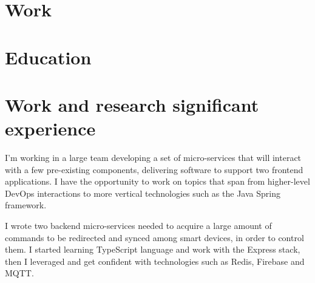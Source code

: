 \documentclass[11pt,a4paper,sans]{moderncv}        %
\begin{document}
\makecvtitle

\setlength{\parskip}{5pt}

\section{Work}
{}{}

\section{Education}
{}{}


\section{Work and research significant experience}

{
    I'm working in a large team developing a set of micro-services that will interact with a few pre-existing components, delivering software to support two frontend applications. I have the opportunity to work on topics that span from higher-level DevOps interactions to more vertical technologies such as the Java Spring framework.
}

{
    I wrote two backend micro-services needed to acquire a large amount of commands to be redirected and synced among smart devices, in order to control them. I started learning TypeScript language and work with the Express stack, then I leveraged and get confident with technologies such as Redis, Firebase and MQTT.
}

\end{document}
